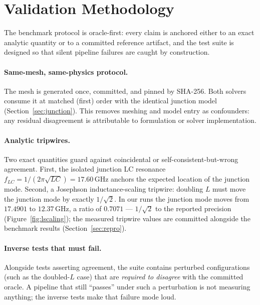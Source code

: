 \documentclass{anvil-paper}
\begin{document}
\section{Validation Methodology}
\label{sec:methodology}

The benchmark protocol is oracle-first: every claim is anchored either to
an exact analytic quantity or to a committed reference artifact, and the
test suite is designed so that silent pipeline failures are caught by
construction.

\paragraph{Same-mesh, same-physics protocol.}
The mesh is generated once, committed, and pinned by SHA-256. Both solvers
consume it at matched (first) order with the identical junction model
(Section~\ref{sec:junction}). This removes meshing and model entry as
confounders: any residual disagreement is attributable to formulation or
solver implementation.

\paragraph{Analytic tripwires.}
Two exact quantities guard against coincidental or self-consistent-but-wrong
agreement. First, the isolated junction LC resonance
$f_{LC} = 1/(2\pi\sqrt{LC}) = 17.60$\,GHz anchors the expected location of
the junction mode. Second, a Josephson inductance-scaling tripwire: doubling
$L$ must move the junction mode by exactly $1/\sqrt{2}$. In our runs the
junction mode moves from $17.4901$ to $12.37$\,GHz, a ratio of $0.7071$ ---
$1/\sqrt{2}$ to the reported precision (Figure~\ref{fig:lscaling}); the
measured tripwire values are committed alongside the benchmark results
(Section~\ref{sec:repro}).

\paragraph{Inverse tests that must fail.}
Alongside tests asserting agreement, the suite contains perturbed
configurations (such as the doubled-$L$ case) that are \emph{required to
disagree} with the committed oracle. A pipeline that still ``passes'' under
such a perturbation is not measuring anything; the inverse tests make that
failure mode loud.
\end{document}
